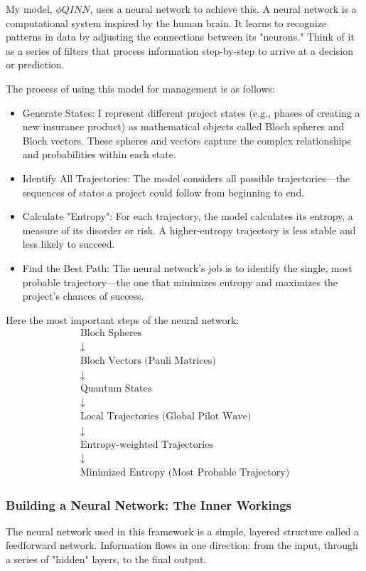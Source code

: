 \documentclass{article}
\begin{document}
My model, $\phi QINN$, uses a neural network to achieve this. A neural network is a computational system inspired by the human brain. It learns to recognize patterns in data by adjusting the connections between its "neurons." Think of it as a series of filters that process information step-by-step to arrive at a decision or prediction.

The process of using this model for management is as follows:
\begin{itemize}
\item Generate States: I represent different project states (e.g., phases of creating a new insurance product) as mathematical objects called Bloch spheres and Bloch vectors. These spheres and vectors capture the complex relationships and probabilities within each state.
\item Identify All Trajectories: The model considers all possible trajectories—the sequences of states a project could follow from beginning to end.
\item Calculate "Entropy": For each trajectory, the model calculates its entropy, a measure of its disorder or risk. A higher-entropy trajectory is less stable and less likely to succeed.
\item Find the Best Path: The neural network's job is to identify the single, most probable trajectory—the one that minimizes entropy and maximizes the project's chances of success.
\end{itemize}
\newpage
Here the most important steps of the neural network:\\
\begin{equation*}
\begin{gathered}
\text{Bloch Spheres} \\
\downarrow \\
\text{Bloch Vectors (Pauli Matrices)} \\
\downarrow \\
\text{Quantum States} \\
\downarrow \\
\text{Local Trajectories (Global Pilot Wave)} \\
\downarrow \\
\text{Entropy-weighted Trajectories} \\
\downarrow \\
\text{Minimized Entropy (Most Probable Trajectory)}
\end{gathered}
\end{equation*}
\subsubsection*{Building a Neural Network: The Inner Workings}
The neural network used in this framework is a simple, layered structure called a feedforward network. Information flows in one direction: from the input, through a series of "hidden" layers, to the final output.
\end{document}
